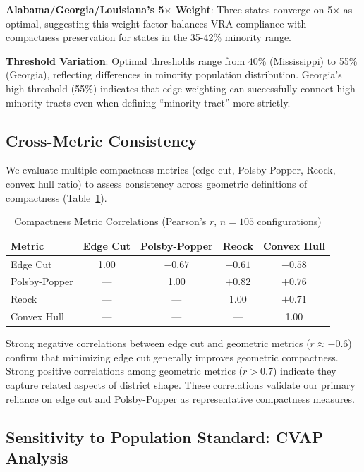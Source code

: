\textbf{Alabama/Georgia/Louisiana's 5$\times$ Weight}: Three states converge on 5$\times$ as optimal, suggesting this weight factor balances VRA compliance with compactness preservation for states in the 35-42\% minority range.

\textbf{Threshold Variation}: Optimal thresholds range from 40\% (Mississippi) to 55\% (Georgia), reflecting differences in minority population distribution. Georgia's high threshold (55\%) indicates that edge-weighting can successfully connect high-minority tracts even when defining ``minority tract'' more strictly.

\subsection{Cross-Metric Consistency}

We evaluate multiple compactness metrics (edge cut, Polsby-Popper, Reock, convex hull ratio) to assess consistency across geometric definitions of compactness (Table~\ref{tab:metric-correlation}).

\begin{table}[htbp]
\centering
\caption{Compactness Metric Correlations (Pearson's $r$, $n=105$ configurations)}
\label{tab:metric-correlation}
\begin{tabular}{lcccc}
\toprule
\textbf{Metric} & \textbf{Edge Cut} & \textbf{Polsby-Popper} & \textbf{Reock} & \textbf{Convex Hull} \\
\midrule
Edge Cut        & 1.00 & $-0.67$ & $-0.61$ & $-0.58$ \\
Polsby-Popper   & --- & 1.00 & $+0.82$ & $+0.76$ \\
Reock           & --- & --- & 1.00 & $+0.71$ \\
Convex Hull     & --- & --- & --- & 1.00 \\
\bottomrule
\end{tabular}
\end{table}

Strong negative correlations between edge cut and geometric metrics ($r \approx -0.6$) confirm that minimizing edge cut generally improves geometric compactness. Strong positive correlations among geometric metrics ($r > 0.7$) indicate they capture related aspects of district shape. These correlations validate our primary reliance on edge cut and Polsby-Popper as representative compactness measures.

\subsection{Sensitivity to Population Standard: CVAP Analysis}

